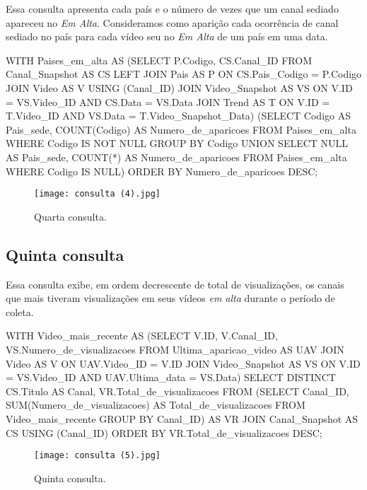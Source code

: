   Essa consulta apresenta cada país e o número de vezes que um canal sediado apareceu no \emph{Em Alta}. Consideramos como aparição cada ocorrência de canal sediado no país para cada vídeo seu no \emph{Em Alta} de um país em uma data.

\begin{code}
WITH
  Paises_em_alta AS
    (SELECT P.Codigo, CS.Canal_ID
         FROM Canal_Snapshot AS CS LEFT JOIN
        Pais AS P ON CS.Pais_Codigo = P.Codigo JOIN
          Video AS V USING (Canal_ID) JOIN
            Video_Snapshot AS VS ON V.ID = VS.Video_ID AND
                        CS.Data = VS.Data JOIN
              Trend AS T ON V.ID = T.Video_ID AND
                      VS.Data = T.Video_Snapshot_Data)
(SELECT Codigo AS Pais_sede, COUNT(Codigo) AS Numero_de_aparicoes
 FROM Paises_em_alta
 WHERE Codigo IS NOT NULL
 GROUP BY Codigo
 UNION
 SELECT NULL AS Pais_sede, COUNT(*) AS Numero_de_aparicoes
 FROM Paises_em_alta
 WHERE Codigo IS NULL)
ORDER BY Numero_de_aparicoes DESC;
\end{code}

\begin{figure}[H]
  \centering
  \texttt{[image: consulta (4).jpg]}
  \caption{Quarta consulta.}
\end{figure}

\subsection{Quinta consulta}

  Essa consulta exibe, em ordem decrescente de total de visualizações, os canais que mais tiveram visualizações em seus vídeos \emph{em alta} durante o período de coleta.

\begin{code}
WITH
  Video_mais_recente AS
    (SELECT V.ID, V.Canal_ID, VS.Numero_de_visualizacoes
         FROM Ultima_aparicao_video AS UAV JOIN
          Video AS V ON UAV.Video_ID = V.ID JOIN
            Video_Snapshot AS VS ON V.ID = VS.Video_ID AND
                        UAV.Ultima_data = VS.Data)
SELECT DISTINCT CS.Titulo AS Canal, VR.Total_de_visualizacoes
FROM (SELECT Canal_ID, SUM(Numero_de_visualizacoes) AS Total_de_visualizacoes
    FROM Video_mais_recente
      GROUP BY Canal_ID) AS VR JOIN
    Canal_Snapshot AS CS USING (Canal_ID)
ORDER BY VR.Total_de_visualizacoes DESC;
\end{code}

\begin{figure}[H]
  \centering
  \texttt{[image: consulta (5).jpg]}
  \caption{Quinta consulta.}
\end{figure}

